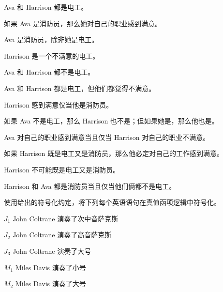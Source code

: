 \begin{compactlist}
\item Ava 和 Harrison 都是电工。
\item 如果 Ava 是消防员，那么她对自己的职业感到满意。
\item Ava 是消防员，除非她是电工。
\item Harrison 是一个不满意的电工。
\item Ava 和 Harrison 都不是电工。
\item Ava 和 Harrison 都是电工，但他们都觉得不满意。
\item Harrison 感到满意仅当他是消防员。
\item 如果 Ava 不是电工，那么 Harrison 也不是；但如果她是，那么他也是。
\item Ava 对自己的职业感到满意当且仅当 Harrison 对自己的职业不满意。
\item 如果 Harrison 既是电工又是消防员，那么他必定对自己的工作感到满意。
\item Harrison 不可能既是电工又是消防员。
\item Harrison 和 Ava 都是消防员当且仅当他们俩都不是电工。
\end{compactlist}

\problempart
使用给出的符号化约定，将下列每个英语语句在真值函项逻辑中符号化。
\label{pr.jazzinstruments}


\begin{ekey}
\item[\ensuremath{J_1}] John Coltrane 演奏了次中音萨克斯
\item[\ensuremath{J_2}] John Coltrane 演奏了高音萨克斯
\item[\ensuremath{J_3}] John Coltrane 演奏了大号
\item[\ensuremath{M_1}] Miles Davis 演奏了小号
\item[\ensuremath{M_2}] Miles Davis 演奏了大号
\end{ekey}

